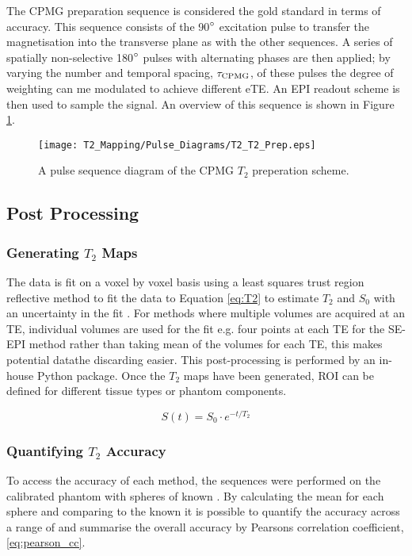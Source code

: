 The \ac{CPMG} \ttwo preparation sequence is considered the gold standard in terms of accuracy. This sequence consists of the 90$\degree$ excitation pulse to transfer the magnetisation into the transverse plane as with the other sequences. A series of spatially non-selective 180$\degree$ pulses with alternating phases are then applied; by varying the number and temporal spacing, $\tau_{\textup{CPMG}}$, of these pulses the degree of \ttwo weighting can me modulated to achieve different \ac{eTE}. An \ac{EPI} readout scheme is then used to sample the signal. An overview of this sequence is shown in Figure \ref{fig:t2_cpmg_t2prep_seq}.

\begin{figure}[H]
	\centering
	\texttt{[image: T2\_Mapping/Pulse\_Diagrams/T2\_T2\_Prep.eps]}
	\caption{A pulse sequence diagram of the \ac{CPMG} $T_2$ preperation scheme.}
	\label{fig:t2_cpmg_t2prep_seq}	
\end{figure}


\subsection{Post Processing}

\subsubsection{Generating $T_2$ Maps}
The data is fit on a voxel by voxel basis using a least squares trust region reflective method to fit the data to Equation \eqref{eq:T2} to estimate $T_2$ and $S_0$ with an uncertainty in the fit \cite{branch_subspace_1999}. For methods where multiple volumes are acquired at an \ac{TE}, individual volumes are used for the fit e.g. four points at each \ac{TE} for the \ac{SE}-\ac{EPI} method rather than taking  mean of the volumes for each \ac{TE}, this makes potential datathe discarding easier. This post-processing is performed by an in-house Python package. Once the $T_2$ maps have been generated, \ac{ROI} can be defined for different tissue types or phantom components.

\begin{equation}
S(t) = S_0 \cdot e^{-t/T_2}
\label{eq:T2}
\end{equation}

\subsubsection{Quantifying $T_2$ Accuracy}
To access the accuracy of each method, the sequences were performed on the calibrated phantom with spheres of known \ttwo. By calculating the mean \ttwo for each sphere and comparing to the known \ttwo it is possible to quantify the accuracy across a range of \ttwo and summarise the overall accuracy by Pearsons correlation coefficient, \eqref{eq:pearson_cc}.

